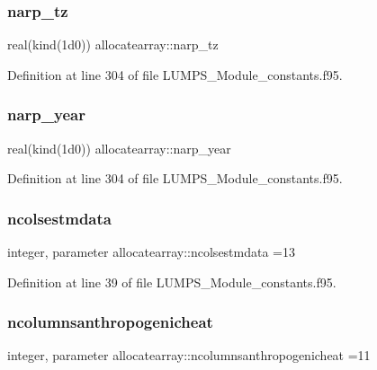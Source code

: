 \subsubsection{\texorpdfstring{narp\+\_\+tz}{narp\_tz}}
{\footnotesize\ttfamily real(kind(1d0)) allocatearray\+::narp\+\_\+tz}



Definition at line 304 of file L\+U\+M\+P\+S\+\_\+\+Module\+\_\+constants.\+f95.

\mbox{\label{namespaceallocatearray_abd08fc8e7202cd8df8d0989842b0b5a6}} 
\subsubsection{\texorpdfstring{narp\+\_\+year}{narp\_year}}
{\footnotesize\ttfamily real(kind(1d0)) allocatearray\+::narp\+\_\+year}



Definition at line 304 of file L\+U\+M\+P\+S\+\_\+\+Module\+\_\+constants.\+f95.

\mbox{\label{namespaceallocatearray_a19316fda887ef62f890249051fdaa79f}} 
\subsubsection{\texorpdfstring{ncolsestmdata}{ncolsestmdata}}
{\footnotesize\ttfamily integer, parameter allocatearray\+::ncolsestmdata =13}



Definition at line 39 of file L\+U\+M\+P\+S\+\_\+\+Module\+\_\+constants.\+f95.

\mbox{\label{namespaceallocatearray_aa1105086801cd6c5c6be1d9563c93341}} 
\subsubsection{\texorpdfstring{ncolumnsanthropogenicheat}{ncolumnsanthropogenicheat}}
{\footnotesize\ttfamily integer, parameter allocatearray\+::ncolumnsanthropogenicheat =11}




